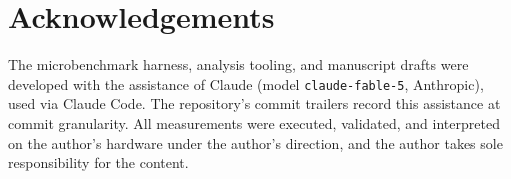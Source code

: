 \section*{Acknowledgements}

The microbenchmark harness, analysis tooling, and manuscript drafts were
developed with the assistance of Claude (model \texttt{claude-fable-5},
Anthropic), used via Claude Code. The repository's commit trailers record
this assistance at commit granularity. All measurements were executed,
validated, and interpreted on the author's hardware under the author's
direction, and the author takes sole responsibility for the content.
